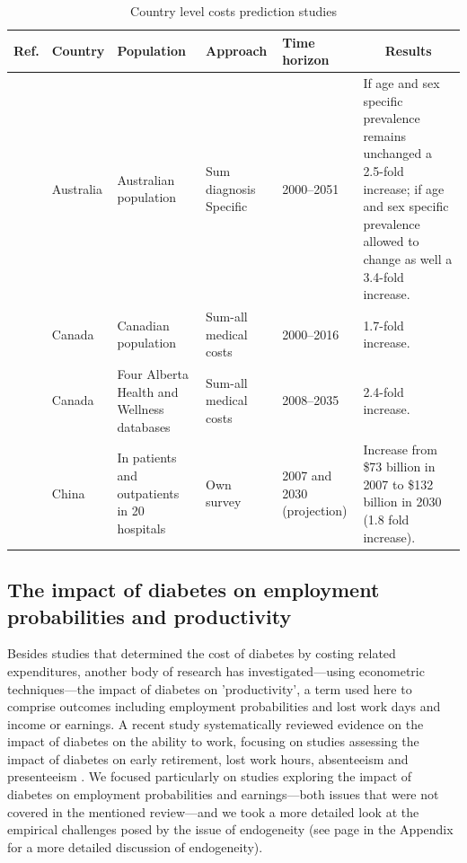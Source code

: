 \begin{table}[p]
\begin{tabularx}{\linewidth}{m m m m m b}
\caption{Country level costs prediction studies}\label{tab:review_prediction}\\
\toprule
Ref. & Country & Population   & Approach & Time  horizon & \multicolumn{1}{c}{Results}                                                                                                                                            \\ \midrule
\textcite{Davis2006b}  & Australia & Australian   population                       & Sum diagnosis  Specific & 2000--2051                                                              & If age and sex specific prevalence remains unchanged a 2.5-fold increase; if age and sex specific prevalence allowed to change as well a 3.4-fold increase. \\
\textcite{Ohinmaa2004}  & Canada    & Canadian   population                         & Sum-all   medical costs  & 2000--2016                                                              & 1.7-fold increase.                                                                                                                                          \\
\textcite{Lau2011a}  & Canada    & Four   Alberta Health and Wellness databases  & Sum-all  medical costs  & 2008--2035                                                              & 2.4-fold increase.                                                                                                                                          \\
\textcite{Wang2009f}  & China     & In   patients and outpatients in 20 hospitals & Own   survey             & 2007 and  2030 (projection) & Increase from \$73 billion in 2007 to \$132 billion in 2030 (1.8 fold increase).                                       \\ \bottomrule
\end{tabularx}
\end{table}

\subsection{The impact of diabetes on employment probabilities and productivity}
Besides studies that determined the cost of diabetes by costing related expenditures, another body of research has investigated---using econometric techniques---the impact of diabetes on 'productivity', a term used here to comprise outcomes including employment probabilities and lost work days and income or earnings. A recent study systematically reviewed evidence on the impact of diabetes on the ability to work, focusing on studies assessing the impact of diabetes on early retirement, lost work hours, absenteeism and presenteeism \parencite{Breton2013}. We focused particularly on studies exploring the impact of diabetes on employment probabilities and earnings---both issues that were not covered in the mentioned review---and we took a more detailed look at the empirical challenges posed by the issue of endogeneity (see page \pageref{sec:appendix_endogeneity} in the Appendix for a more detailed discussion of endogeneity).

